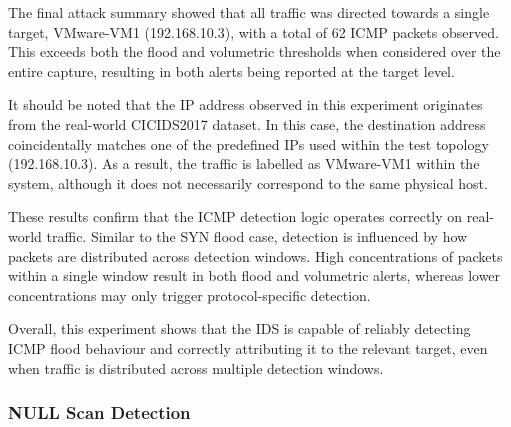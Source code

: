 The final attack summary showed that all traffic was directed towards a single
target, VMware-VM1 (192.168.10.3), with a total of 62 ICMP packets observed.
This exceeds both the flood and volumetric thresholds when considered over the
entire capture, resulting in both alerts being reported at the target level.

It should be noted that the IP address observed in this experiment originates
from the real-world CICIDS2017 dataset. In this case, the destination address
coincidentally matches one of the predefined IPs used within the test topology
(192.168.10.3). As a result, the traffic is labelled as VMware-VM1 within the
system, although it does not necessarily correspond to the same physical host.

These results confirm that the ICMP detection logic operates correctly on
real-world traffic. Similar to the SYN flood case, detection is influenced by
how packets are distributed across detection windows. High concentrations of
packets within a single window result in both flood and volumetric alerts,
whereas lower concentrations may only trigger protocol-specific detection.

Overall, this experiment shows that the IDS is capable of reliably
detecting ICMP flood behaviour and correctly attributing it to the relevant
target, even when traffic is distributed across multiple detection windows.


\subsubsection{NULL Scan Detection}

\begin{table}[H]
    \centering
    \caption{NULL scan detection results using CICIDS2017 dataset}
    \label{tab:null_results}
\end{table}

